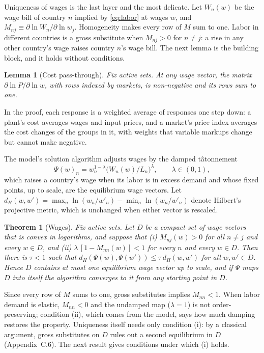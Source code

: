 \documentclass[11pt]{article}
\newtheorem{theorem}{Theorem}
\newtheorem{lemma}{Lemma}
\theoremstyle{definition}
\theoremstyle{remark}
\begin{document}
\noindent Uniqueness of wages is the last layer and the most delicate. Let
$W_n(w)$ be the wage bill of country $n$ implied by \eqref{eq:labor} at wages $w$, and
$M_{nj}\equiv\partial\ln W_n/\partial\ln w_j$. Homogeneity makes every row of $M$ sum
to one. Labor in different countries is a gross substitute when $M_{nj}>0$ for
$n\neq j$: a rise in any other country's wage raises country $n$'s wage bill. The
next lemma is the building block, and it holds without conditions.

\begin{lemma}[Cost pass-through]\label{lem:pass}
Fix active sets. At any wage vector, the matrix $\partial\ln P/\partial\ln w$, with
rows indexed by markets, is non-negative and its rows sum to one.
\end{lemma}

\noindent In the proof, each response is a weighted average of responses one step
down: a plant's cost averages wages and input prices, and a market's price index
averages the cost changes of the groups in it, with weights that variable markups
change but cannot make negative.

The model's solution algorithm adjusts wages by the damped tâtonnement
\[
  \Psi(w)_n=w_n^{1-\lambda}\bigl(W_n(w)/L_n\bigr)^{\lambda},\qquad\lambda\in(0,1),
\]
which raises a country's wage when its labor is in excess demand and whose fixed
points, up to scale, are the equilibrium wage vectors. Let
$d_H(w,w')=\max_n\ln(w_n/w'_n)-\min_n\ln(w_n/w'_n)$ denote Hilbert's projective
metric, which is unchanged when either vector is rescaled.

\begin{theorem}[Wages]\label{thm:wages}
Fix active sets. Let $D$ be a compact set of wage vectors that is convex in logarithms, and
suppose that (i) $M_{nj}(w)>0$ for all $n\neq j$ and every $w\in D$, and (ii)
$\lambda\,[1-M_{nn}(w)]<1$ for every $n$ and every $w\in D$. Then there is $\tau<1$ such that
$d_H(\Psi(w),\Psi(w'))\le\tau\,d_H(w,w')$ for all $w,w'\in D$. Hence $D$ contains at
most one equilibrium wage vector up to scale, and if $\Psi$ maps $D$ into itself the
algorithm converges to it from any starting point in $D$.
\end{theorem}

\noindent Since every row of $M$ sums to one, gross substitutes implies $M_{nn}<1$.
When labor demand is elastic, $M_{nn}<0$ and the undamped map ($\lambda=1$) is not
order-preserving; condition (ii), which comes from the model, says how much damping
restores the property. Uniqueness itself needs only condition (i): by a classical
argument, gross substitutes on $D$ rules out a second equilibrium in $D$
(Appendix~C.6). The next result gives conditions under which (i) holds.
\end{document}
